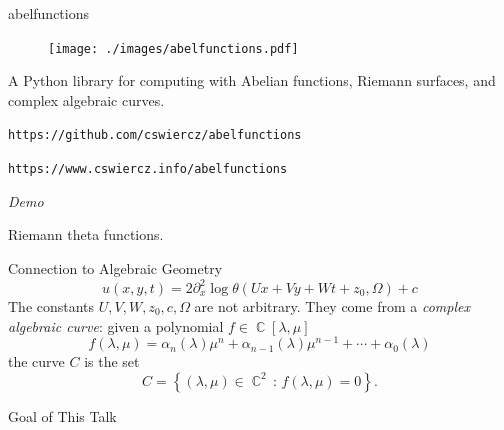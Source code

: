\documentclass{beamer}
\DeclareMathOperator{\CC}{\mathbb{C}}
\begin{document}
\begin{frame}{abelfunctions}{}
  \begin{block}{}
  \begin{figure}[t]
    \centering
    \texttt{[image: ./images/abelfunctions.pdf]}
  \end{figure}
  \end{block}

  \vspace{16pt}

  A Python library for computing with Abelian functions, Riemann
  surfaces, and complex algebraic curves.
  \begin{center}
    {\tt https://github.com/cswiercz/abelfunctions}

    {\tt https://www.cswiercz.info/abelfunctions}
  \end{center}
\end{frame}



\begin{frame}{\phantom{Demo}}{}
  \begin{center}
    {\huge \it Demo}

    \vspace{1cm}

    Riemann theta functions.
  \end{center}
\end{frame}



\begin{frame}{Connection to Algebraic Geometry}{}
  \[
    u(x,y,t) = 2 \partial_x^2 \log
    \theta(Ux + Vy + Wt + z_0, \Omega) + c
  \]
  The constants $U,V,W,z_0,c,\Omega$ are not arbitrary. They come from a
  {\it complex algebraic curve}: given a polynomial $f \in
  \CC[\lambda,\mu]$
  \[
      f(\lambda,\mu) =
      \alpha_n(\lambda)\mu^n +
      \alpha_{n-1}(\lambda)\mu^{n-1} +
      \cdots +
      \alpha_0(\lambda)
  \]
  the curve $C$ is the set
  \[
  C = \left\{ (\lambda,\mu) \in \CC^2 \, : \, f(\lambda,\mu) = 0 \right\}.
  \]
\end{frame}



\begin{frame}{Goal of This Talk}{}
  \tableofcontents
\end{frame}



\end{document}

